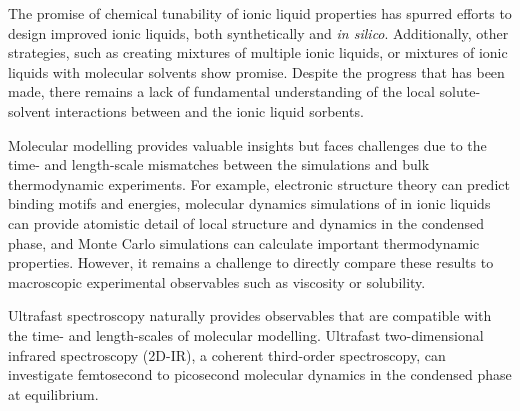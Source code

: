 \documentclass[%
  class = book,%
  crop = false,%
  float = true,%
  multi = true,%
  preview = false,%
]{standalone}
\let\cite\autocite
\newcommand{\latin}[1]{\textit{#1}}
\begin{document}
The promise of chemical tunability of ionic liquid properties has spurred efforts to design improved ionic liquids, both synthetically\cite{batesJACS-02,ramdinIECR-12,Wang2011,Wang2010a,Zhang2009,Gurkan2010,seoJPCB-14} and \latin{in silico}.\cite{Paduszynski2014,Yan2014}  Additionally, other strategies, such as creating mixtures of multiple ionic liquids,\cite{Chatel2014,Maximo2014} or mixtures of ionic liquids with molecular solvents\cite{Romanos2013,Camper2008} show promise. Despite the progress that has been made, there remains a lack of fundamental understanding of the local solute-solvent interactions between  and the ionic liquid sorbents.

Molecular modelling provides valuable insights but faces challenges due to the time- and length-scale mismatches between the simulations and bulk thermodynamic experiments. For example, electronic structure theory can predict  binding motifs and energies,\cite{Yu2006,Bhargava2007,Gonzalez-Miquel2012,Steckel2012} molecular dynamics simulations of  in ionic liquids can provide atomistic detail of local structure and dynamics in the condensed phase,\cite{Huang2005,Kerle2009,palomarIECR-11,wendlerJCTC-12,holloczkiCPC-13,Shim2010} and Monte Carlo simulations can calculate important thermodynamic properties.\cite{Shi2010,Shi2014,Shah2002,Kerle2009,Kerle2013,Ghobadi2011} However, it remains a challenge to directly compare these results to macroscopic experimental observables such as viscosity or  solubility.

Ultrafast spectroscopy naturally provides observables that are compatible with the time- and length-scales of molecular modelling. Ultrafast two-dimensional infrared spectroscopy (2D-IR), a coherent third-order spectroscopy, can investigate femtosecond to picosecond molecular dynamics in the condensed phase at equilibrium.\cite{khalilJPCA-03,choCR-08b,hamm_concepts_2011,Zheng2005}
\end{document}
